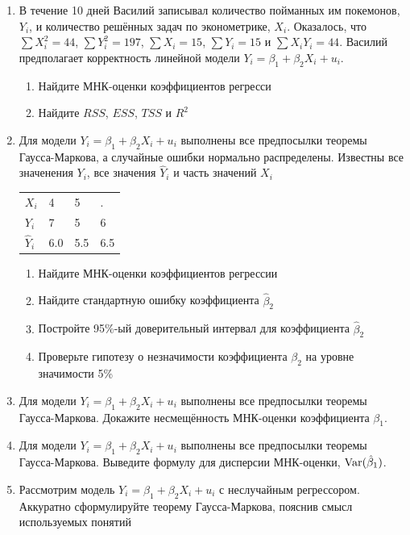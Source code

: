 \documentclass[12pt, a4paper]{article}\usepackage[]{graphicx}\usepackage[]{color}
\begin{document}
\begin{enumerate}












\item В течение 10 дней Василий записывал количество пойманных им покемонов, $Y_i$, и количество решённых задач по эконометрике, $X_i$. Оказалось, что $\sum X_i^2 = 44$, $\sum Y_i^2 = 197$, $\sum X_i = 15 $, $\sum Y_i = 15$ и $\sum X_i Y_i = 44$. Василий предполагает корректность линейной модели $Y_i = \beta_1 + \beta_2 X_i + u_i$.
\begin{enumerate}
\item Найдите МНК-оценки коэффициентов регресси
\item Найдите $RSS$, $ESS$, $TSS$ и $R^2$
\end{enumerate}
 \item Для модели $Y_i = \beta_1 + \beta_2 X_i + u_i$ выполнены все предпосылки теоремы Гаусса-Маркова, а случайные ошибки нормально распределены. Известны все значенения $Y_i$, все значения $\hat Y_i$ и часть значений $X_i$

\begin{tabular}{llll}
\toprule
$X_i$      & 4 & 5 & . \\
$Y_i$      & 7 & 5 & 6 \\
$\hat Y_i$ & 6.0 & 5.5 & 6.5 \\
\bottomrule
\end{tabular}

\begin{enumerate}
\item Найдите МНК-оценки коэффициентов регрессии
\item Найдите стандартную ошибку коэффициента $\hat \beta_2$
\item Постройте 95\%-ый доверительный интервал для коэффициента $\hat \beta_2$
\item Проверьте гипотезу о незначимости коэффициента $\beta_2$ на уровне значимости 5\%
\end{enumerate}
 \item Для модели $Y_i = \beta_1 + \beta_2 X_i + u_i$ выполнены все предпосылки теоремы Гаусса-Маркова. Докажите несмещённость МНК-оценки коэффициента $\beta_1$. \item Для модели $Y_i = \beta_1 + \beta_2 X_i + u_i$ выполнены все предпосылки теоремы Гаусса-Маркова. Выведите формулу для дисперсии МНК-оценки, $\operatorname{Var}(\hat{\beta}_1)$. \item Рассмотрим модель $Y_i = \beta_1 + \beta_2 X_i + u_i$ с неслучайным регрессором. Аккуратно сформулируйте теорему Гаусса-Маркова, пояснив смысл используемых понятий

\end{enumerate}
\end{document}
